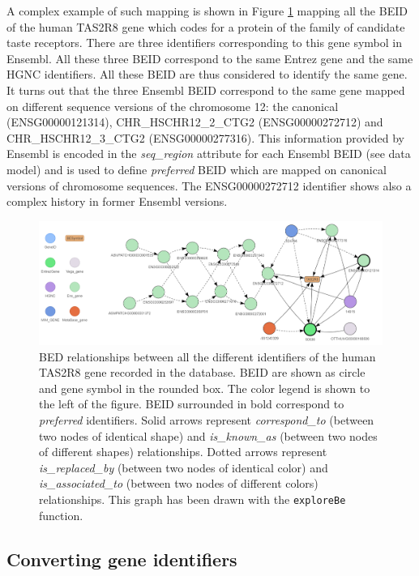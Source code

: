 \documentclass[9pt,a4paper,]{extarticle}
\theoremstyle{definition}
\theoremstyle{definition}
\theoremstyle{definition}
\theoremstyle{remark}
\begin{document}
A complex example of such mapping is shown in Figure \ref{fig:TAS2R8}
mapping all the BEID of the human TAS2R8 gene which codes for a protein
of the family of candidate taste receptors. There are three identifiers
corresponding to this gene symbol in Ensembl. All these three BEID
correspond to the same Entrez gene and the same HGNC identifiers.
All these BEID are thus considered to identify the same gene. It turns out
that the three Ensembl BEID correspond to the same gene mapped on different
sequence versions of the chromosome 12: the canonical (ENSG00000121314),
CHR\_HSCHR12\_2\_CTG2 (ENSG00000272712)
and CHR\_HSCHR12\_3\_CTG2 (ENSG00000277316).
This information provided by Ensembl is encoded in the \emph{seq\_region}
attribute for each Ensembl BEID (see data model)
and is used to define \emph{preferred} BEID which are mapped on canonical versions
of chromosome sequences.
The ENSG00000272712 identifier shows also a complex history in former
Ensembl versions.

\begin{figure}

{\centering \includegraphics[width=1\linewidth]{img/TAS2R8-Identifiers} 

}

\caption{BED relationships between all the different identifiers of the human TAS2R8 gene recorded in the database. BEID are shown as circle and gene symbol in the rounded box. The color legend is shown to the left of the figure. BEID surrounded in bold correspond to \emph{preferred} identifiers. Solid arrows represent \emph{correspond\_to} (between two nodes of identical shape) and \emph{is\_known\_as} (between two nodes of different shapes) relationships. Dotted arrows represent \emph{is\_replaced\_by} (between two nodes of identical color) and \emph{is\_associated\_to} (between two nodes of different colors) relationships. This graph has been drawn with the \texttt{exploreBe} function.}\label{fig:TAS2R8}
\end{figure}

\subsection{Converting gene identifiers}\label{converting-gene-identifiers}
\end{document}
